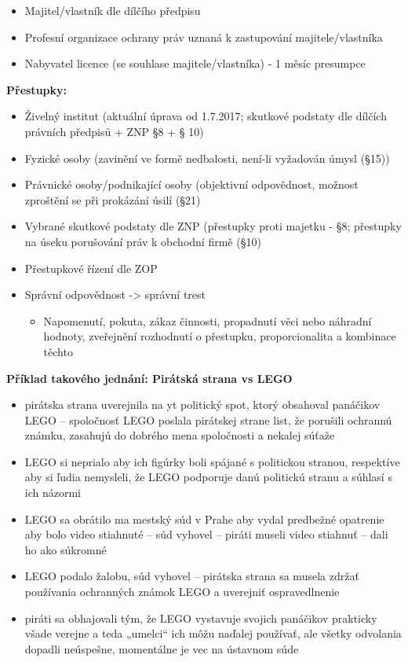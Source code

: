 \begin{itemize}
    \item Majitel/vlastník dle dílčího předpisu
    \item Profesní organizace ochrany práv uznaná k zastupování majitele/vlastníka
    \item Nabyvatel licence (se souhlase majitele/vlastníka) - 1 měsíc presumpce
\end{itemize}
\textbf{Přestupky:}
\begin{itemize}
    \item Živelný institut (aktuální úprava od 1.7.2017; skutkové podstaty dle dílčích právních předpisů + ZNP §8
    + § 10)
    \item Fyzické osoby (zavinění ve formě nedbalosti, není-li vyžadován úmysl (§15))
    \item Právnické osoby/podnikající osoby (objektivní odpovědnost, možnost zproštění se při prokázání úsilí
    (§21)
    \item Vybrané skutkové podstaty dle ZNP (přestupky proti majetku - §8; přestupky na úseku porušování práv
    k obchodní firmě (§10)
    \item Přestupkové řízení dle ZOP
    \item Správní odpovědnost -> správní trest
    \begin{itemize}
        \item Napomenutí, pokuta, zákaz činnosti, propadnutí věci nebo náhradní hodnoty, zveřejnění
rozhodnutí o přestupku, proporcionalita a kombinace těchto
    \end{itemize}
\end{itemize}
\textbf{Příklad takového jednání: Pirátská strana vs LEGO}
\begin{itemize}
    \item pirátska strana uverejnila na yt politický spot, ktorý obsahoval panáčikov
    LEGO – spoločnosť LEGO poslala pirátskej strane list, že porušili ochrannú
    známku, zasahujú do dobrého mena spoločnosti a nekalej súťaže
    \item  LEGO si neprialo aby ich figúrky boli spájané s politickou stranou,
    respektíve aby si ľudia nemysleli, že LEGO podporuje danú politickú stranu
    a súhlasí s ich názormi
    \item  LEGO sa obrátilo ma mestský súd v Prahe aby vydal predbežné opatrenie
    aby bolo video stiahnuté – súd vyhovel – piráti museli video stiahnuť – dali
    ho ako súkromné
    \item  LEGO podalo žalobu, súd vyhovel – pirátska strana sa musela zdržať
    používania ochranných známok LEGO a uverejniť ospravedlnenie
    \item  piráti sa obhajovali tým, že LEGO vystavuje svojich panáčikov prakticky
    všade verejne a teda „umelci“ ich môžu naďalej používať, ale všetky
    odvolania dopadli neúspešne, momentálne je vec na ústavnom súde

\end{itemize}

